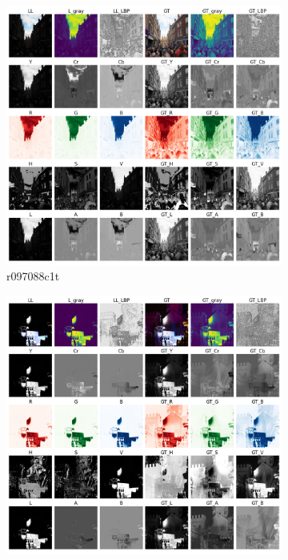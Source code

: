 \documentclass[a4paper]{ctexart}
\begin{document}
		
		\begin{figure}[htbp]
			\centering
			\begin{subfigure}{0.3\textwidth}
				\includegraphics[width=\linewidth]{picture/LLIE/Experiment/myplot_different_color_channels_r097088c1t}
				\captionsetup{font=scriptsize}
				\caption{r097088c1t}
				\label{fig: myplot_different_color_channels_r097088c1t}	
			\end{subfigure}
			\begin{subfigure}{0.3\textwidth}
				\includegraphics[width=\linewidth]{picture/LLIE/Experiment/myplot_different_color_channels_r141669e5t}

\end{subfigure}
\end{figure}
\end{document}
